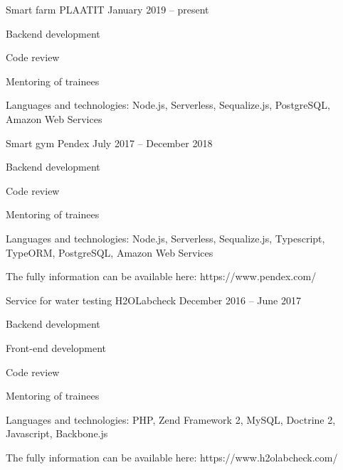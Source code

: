

\begin{cventries}

  \cventry
    {Smart farm}
    {PLAATIT}
    {}
    {January 2019 – present}
    {
      \begin{cvitems}
        \item {Backend development}
        \item {Code review}
        \item {Mentoring of trainees}
        \item {Languages and technologies: Node.js, Serverless, Sequalize.js, PostgreSQL, Amazon Web Services}
      \end{cvitems}
    }

  \cventry
    {Smart gym}
    {Pendex}
    {}
    {July 2017 – December 2018}
    {
      \begin{cvitems}
        \item {Backend development}
        \item {Code review}
        \item {Mentoring of trainees}
        \item {Languages and technologies: Node.js, Serverless, Sequalize.js, Typescript, TypeORM, PostgreSQL, Amazon Web Services}
        \item {The fully information can be available here: https://www.pendex.com/}
      \end{cvitems}
    }

  \cventry
    {Service for water testing}
    {H2OLabcheck}
    {}
    {December 2016 – June 2017}
    {
      \begin{cvitems}
        \item {Backend development}
        \item {Front-end development}
        \item {Code review}
        \item {Mentoring of trainees}
        \item {Languages and technologies: PHP, Zend Framework 2, MySQL, Doctrine 2, Javascript, Backbone.js}
        \item {The fully information can be available here: https://www.h2olabcheck.com/}
      \end{cvitems}
    }


\end{cventries}
